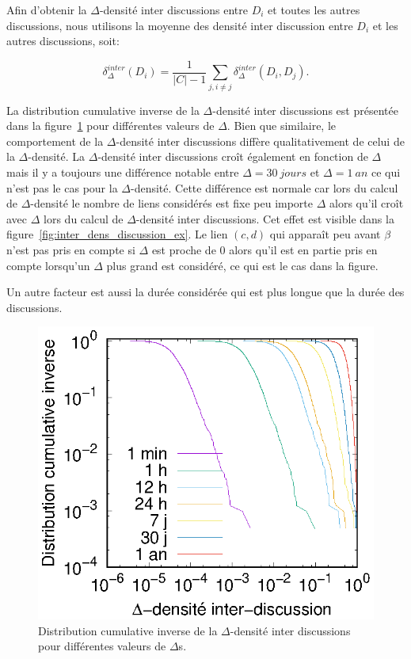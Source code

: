 Afin d'obtenir la $\Delta$-densité inter discussions entre $D_i$ et toutes les autres discussions, nous utilisons la moyenne des densité inter discussion entre $D_i$ et les autres discussions, soit:

\begin{equation}
	\delta^{inter}_{\Delta}(D_i) = \frac{1}{|C|-1}\sum_{j,i\ne j} \delta^{inter}_{\Delta}(D_i,D_j).
\end{equation}

La distribution cumulative inverse de la $\Delta$-densité inter discussions est présentée dans la figure~\ref{fig:inter_dens_discussion} pour différentes valeurs de $\Delta$.
Bien que similaire, le comportement de la $\Delta$-densité inter discussions diffère qualitativement de celui de la $\Delta$-densité.
La $\Delta$-densité inter discussions croît également en fonction de $\Delta$ mais il y a toujours une différence notable entre $\Delta= 30\  jours$ et $\Delta= 1\ an$ ce qui n'est pas le cas pour la $\Delta$-densité.
Cette différence est normale car lors du calcul de $\Delta$-densité le nombre de liens considérés est fixe peu importe $\Delta$ alors qu'il croît avec $\Delta$ lors du calcul de $\Delta$-densité inter discussions.
Cet effet est visible dans la figure~\ref{fig:inter_dens_discussion_ex}.
Le lien $(c,d)$ qui apparaît peu avant $\beta$ n'est pas pris en compte si $\Delta$ est proche de $0$ alors qu'il est en partie pris en compte lorsqu'un $\Delta$ plus grand est considéré, ce qui est le cas dans la figure.

Un autre facteur est aussi la durée considérée qui est plus longue que la durée des discussions.
\begin{figure}
\centering
	\includegraphics[width=0.4\linewidth]{img/mailing/inter_delta.eps}
\caption{Distribution cumulative inverse de la $\Delta$-densité inter discussions pour différentes valeurs de $\Delta$s.}
\label{fig:inter_dens_discussion}
\end{figure}

\bigskip

